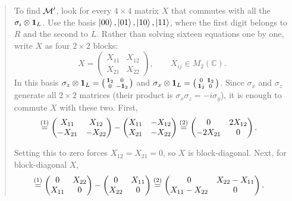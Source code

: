 \begin{quote}
To find $\mathcal{M}'$, look for every $4\times4$ matrix $X$ that commutes with all the $\sigma_i\otimes\mathbf{1}_L$. Use the
basis $\ket{00},\ket{01},\ket{10},\ket{11}$, where the first digit belongs to $R$ and the second to $L$. Rather
than solving sixteen equations one by one, write $X$ as four $2\times2$ blocks:
\[
X = \begin{pmatrix} X_{11} & X_{12} \\ X_{21} & X_{22} \end{pmatrix}, \qquad X_{ij} \in M_2(\mathbb C) .
\]
In this basis $\sigma_z\otimes\mathbf{1}_L=\begin{psmallmatrix}\mathbf{1}_2&0\\0&-\mathbf{1}_2\end{psmallmatrix}$ and
$\sigma_x\otimes\mathbf{1}_L=\begin{psmallmatrix}0&\mathbf{1}_2\\\mathbf{1}_2&0\end{psmallmatrix}$. Since $\sigma_x$ and $\sigma_z$
generate all $2\times2$ matrices (their product is $\sigma_x\sigma_z=-i\sigma_y$), it is enough to commute $X$
with these two. First,
\begin{align}
[\sigma_z\otimes\id_L,\, X]
&\eqstep{1} \begin{pmatrix} X_{11} & X_{12} \\ -X_{21} & -X_{22} \end{pmatrix}
- \begin{pmatrix} X_{11} & -X_{12} \\ X_{21} & -X_{22} \end{pmatrix}
\eqstep{2} \begin{pmatrix} 0 & 2X_{12} \\ -2X_{21} & 0 \end{pmatrix} .
\notag
\end{align}
\quad
{}

Setting this to zero forces $X_{12}=X_{21}=0$, so $X$ is block-diagonal. Next, for block-diagonal $X$,
\begin{align}
[\sigma_x\otimes\id_L,\, X]
&\eqstep{1} \begin{pmatrix} 0 & X_{22} \\ X_{11} & 0 \end{pmatrix}
- \begin{pmatrix} 0 & X_{11} \\ X_{22} & 0 \end{pmatrix}
\eqstep{2} \begin{pmatrix} 0 & X_{22}-X_{11} \\ X_{11}-X_{22} & 0 \end{pmatrix} .
\notag
\end{align}
\quad
{}


\end{quote}

